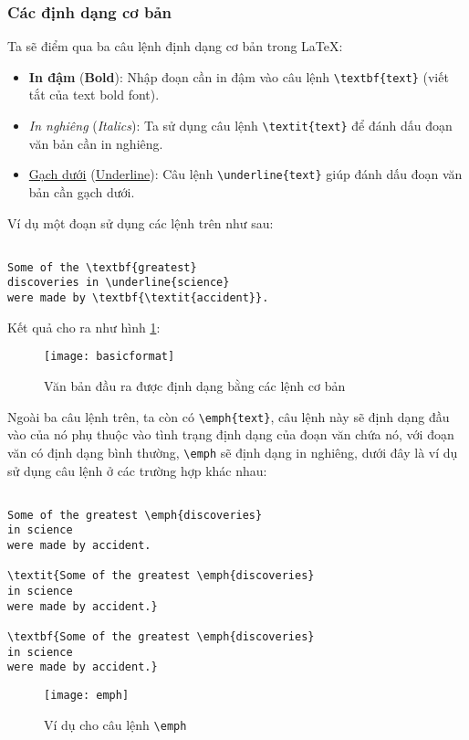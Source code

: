 \subsubsection*{Các định dạng cơ bản}
Ta sẽ điểm qua ba câu lệnh định dạng cơ bản trong LaTeX:\par
\begin{itemize}
 \item \textbf{In đậm} (\textbf{Bold}): Nhập đoạn cần in đậm vào câu lệnh \verb=\textbf{text}= (viết
 tắt của text bold font).
 \item \textit{In nghiêng} (\textit{Italics}): Ta sử dụng câu lệnh \verb=\textit{text}= để đánh dấu đoạn văn
 bản cần in nghiêng.
 \item \underline{Gạch dưới} (\underline{Underline}): Câu lệnh \verb=\underline{text}= giúp đánh dấu đoạn
 văn bản cần gạch dưới.
\end{itemize}

Ví dụ một đoạn sử dụng các lệnh trên như sau:\par
\begin{verbatim}

Some of the \textbf{greatest}
discoveries in \underline{science} 
were made by \textbf{\textit{accident}}.

\end{verbatim}

Kết quả cho ra như hình \ref{fig:basicformat}:\par
\begin{figure}[H]
 \centering
 \texttt{[image: basicformat]}
 \caption{Văn bản đầu ra được định dạng bằng các lệnh cơ bản}
 \label{fig:basicformat} 
\end{figure}

Ngoài ba câu lệnh trên, ta còn có \verb=\emph{text}=, câu lệnh này sẽ định dạng đầu vào của nó phụ thuộc
vào tình trạng định dạng của đoạn văn chứa nó, với đoạn văn có định dạng bình thường, \verb=\emph= sẽ định
dạng in nghiêng, dưới đây là ví dụ sử dụng câu lệnh ở các trường hợp khác nhau:\par
\clearpage 
\begin{verbatim}

Some of the greatest \emph{discoveries} 
in science 
were made by accident.
 
\textit{Some of the greatest \emph{discoveries} 
in science 
were made by accident.}
 
\textbf{Some of the greatest \emph{discoveries} 
in science 
were made by accident.}

\end{verbatim}
\begin{figure}[H]
 \centering
 \texttt{[image: emph]}
 \caption{Ví dụ cho câu lệnh \texttt{\textbackslash emph}}
 \label{fig:emph}
\end{figure}

